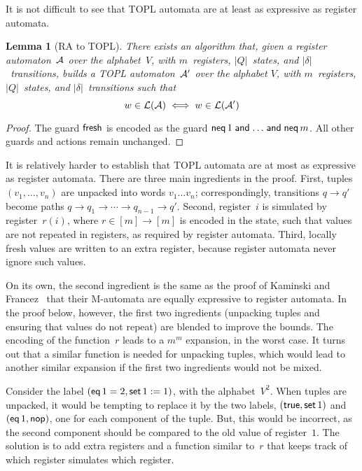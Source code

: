 \documentclass{article} %
\newtheorem{lemma}{Lemma}
\theoremstyle{definition}
\theoremstyle{remark}
\begin{document}
It is not difficult to see that TOPL automata are at least as expressive as register automata.

\begin{lemma}[RA to TOPL]\label{lemma:ra-to-topl}
There exists an algorithm that, given a register automaton~${\cal A}$ over the alphabet~$V$, with $m$~registers, $|Q|$~states, and $|\delta|$~transitions, builds a TOPL automaton~${\cal A}'$ over the alphabet $V$, with $m$~registers, $|Q|$~states, and $|\delta|$~transitions such that
\[w\in{\cal L}({\cal A}) \iff w\in{\cal L}({\cal A}') \]
\end{lemma}
\begin{proof}
The guard ${\sf fresh}$ is encoded as the guard ${\sf neq}\,1 \mathrel{\sf and} \ldots \mathrel{\sf and}{\sf neq}\,m$.
All other guards and actions remain unchanged.
\end{proof}

It is relatively harder to establish that TOPL automata are at most as expressive as register automata.
There are three main ingredients in the proof.
First, tuples $(v_1,\ldots,v_n)$ are unpacked into words $v_1\ldots v_n$; correspondingly, transitions $q\to q'$ become paths $q\to q_1\to\cdots\to q_{n-1}\to q'$.
Second, register~$i$ is simulated by register~$r(i)$, where $r\in[m]\to[m]$ is encoded in the state, such that values are not repeated in registers, as required by register automata.
Third, locally fresh values are written to an extra register, because register automata never ignore such values.

On its own, the second ingredient is the same as the proof of Kaminski and Francez~\cite{dblp:journals/tcs/kaminskif94} that their M-automata are equally expressive to register automata.
In the proof below, however, the first two ingredients (unpacking tuples and ensuring that values do not repeat) are blended to improve the bounds.
The encoding of the function~$r$ leads to a $m^m$ expansion, in the worst case.
It turns out that a similar function is needed for unpacking tuples, which would lead to another similar expansion if the first two ingredients would not be mixed.

Consider the label $({\sf eq}\,1=2,{\sf set}\,1:=1)$, with the alphabet~$V^2$.
When tuples are unpacked, it would be tempting to replace it by the two labels, $({\sf true},{\sf set}\,1)$ and $({\sf eq}\,1,{\sf nop})$, one for each component of the tuple.
But, this would be incorrect, as the second component should be compared to the old value of register~$1$.
The solution is to add extra registers and a function similar to~$r$ that keeps track of which register simulates which register.
\end{document}
